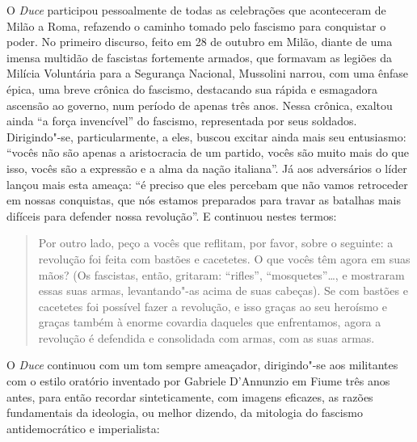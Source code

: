 O \emph{Duce} participou pessoalmente de todas as celebrações que
aconteceram de Milão a Roma, refazendo o caminho tomado pelo fascismo
para conquistar o poder. No primeiro discurso, feito em 28 de outubro em
Milão, diante de uma imensa multidão de fascistas fortemente armados,
que formavam as legiões da Milícia Voluntária para a Segurança Nacional,
Mussolini narrou, com uma ênfase épica, uma breve crônica do fascismo,
destacando sua rápida e esmagadora ascensão ao governo, num período de
apenas três anos. Nessa crônica, exaltou ainda ``a força invencível'' do
fascismo, representada por seus soldados. Dirigindo"-se, particularmente,
a eles, buscou excitar ainda mais seu entusiasmo: ``vocês não são apenas
a aristocracia de um partido, vocês são muito mais do que isso, vocês
são a expressão e a alma da nação italiana''. Já aos adversários o líder
lançou mais esta ameaça: ``é preciso que eles percebam que não vamos
retroceder em nossas conquistas, que nós estamos preparados para travar
as batalhas mais difíceis para defender nossa revolução''. E continuou
nestes termos:

\begin{quote}
Por outro lado, peço a vocês que reflitam, por favor, sobre o seguinte:
a revolução foi feita com bastões e cacetetes. O que vocês têm agora em
suas mãos? (Os fascistas, então, gritaram: ``rifles'', ``mosquetes''\ldots{},
e mostraram essas suas armas, levantando"-as acima de suas cabeças). Se
com bastões e cacetetes foi possível fazer a revolução, e isso graças ao
seu heroísmo e graças também à enorme covardia daqueles que enfrentamos,
agora a revolução é defendida e consolidada com armas, com as suas
armas.
\end{quote}

O \emph{Duce} continuou com um tom sempre ameaçador, dirigindo"-se aos
militantes com o estilo oratório inventado por Gabriele D'Annunzio em
Fiume três anos antes, para então recordar sinteticamente, com imagens
eficazes, as razões fundamentais da ideologia, ou melhor dizendo, da
mitologia do fascismo antidemocrático e imperialista:

